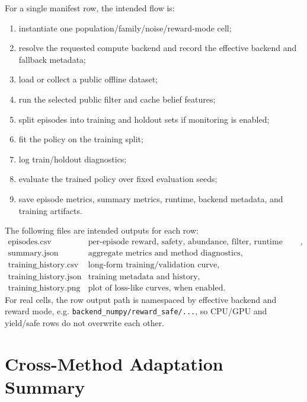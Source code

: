\documentclass[11pt]{article}
\newcommand{\code}[1]{\texttt{#1}}
\newcommand{\1}{\mathbf{1}}
\begin{document}
For a single manifest row, the intended flow is:
\begin{enumerate}[leftmargin=*]
  \item instantiate one population/family/noise/reward-mode cell;
  \item resolve the requested compute backend and record the effective backend
  and fallback metadata;
  \item load or collect a public offline dataset;
  \item run the selected public filter and cache belief features;
  \item split episodes into training and holdout sets if monitoring is enabled;
  \item fit the policy on the training split;
  \item log train/holdout diagnostics;
  \item evaluate the trained policy over fixed evaluation seeds;
  \item save episode metrics, summary metrics, runtime, backend metadata, and
  training artifacts.
\end{enumerate}

The following files are intended outputs for each row:
\[
\begin{array}{ll}
\text{episodes.csv} & \text{per-episode reward, safety, abundance, filter, runtime metrics},\\
\text{summary.json} & \text{aggregate metrics and method diagnostics},\\
\text{training\_history.csv} & \text{long-form training/validation curve},\\
\text{training\_history.json} & \text{training metadata and history},\\
\text{training\_history.png} & \text{plot of loss-like curves, when enabled}.
\end{array}
\]
For real cells, the row output path is namespaced by effective backend and reward
mode, e.g. \code{backend\_numpy/reward\_safe/...}, so CPU/GPU and yield/safe
rows do not overwrite each other.

\section{Cross-Method Adaptation Summary}
\end{document}
